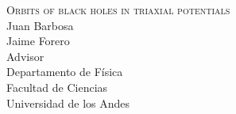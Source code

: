 \documentclass{beamer}
\newcommand\blfootnote[1]
{%
	\begingroup
	\renewcommand\thefootnote{}\footnote{#1}%
	\addtocounter{footnote}{-1}%
	\endgroup
}
\newcommand{\fcite}[1]{\blfootnote{\tiny\cite{#1}}}
\begin{document}
\begin{frame}
	\centering
	\textsc{\LARGE Orbits of black holes in triaxial potentials}
	\\
	\vspace{2.5cm}
	Juan Barbosa\\
	\vspace{1cm}
	\small
	Jaime Forero\\ 
	Advisor\\
	\vspace{0.5cm}
	\footnotesize
	Departamento de F\'isica\\
	Facultad de Ciencias\\
	Universidad de los Andes
\end{frame}



%	
\end{document}
